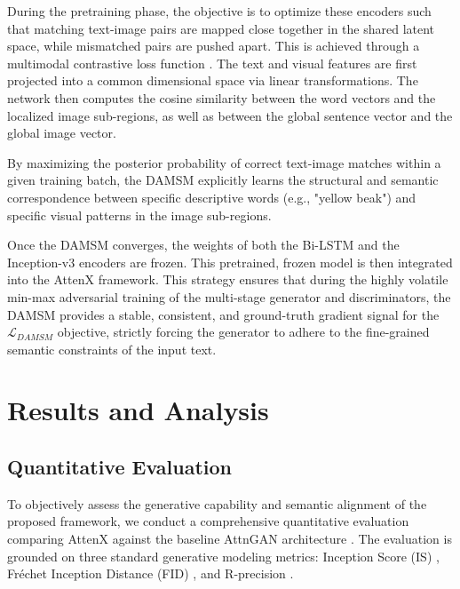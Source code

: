 \documentclass[conference]{IEEEtran}
\begin{document}
During the pretraining phase, the objective is to optimize these encoders such that matching text-image pairs are mapped close together in the shared latent space, while mismatched pairs are pushed apart. This is achieved through a multimodal contrastive loss function \cite{reed2016learning}. The text and visual features are first projected into a common dimensional space via linear transformations. The network then computes the cosine similarity between the word vectors and the localized image sub-regions, as well as between the global sentence vector and the global image vector.

By maximizing the posterior probability of correct text-image matches within a given training batch, the DAMSM explicitly learns the structural and semantic correspondence between specific descriptive words (e.g., "yellow beak") and specific visual patterns in the image sub-regions.

Once the DAMSM converges, the weights of both the Bi-LSTM and the Inception-v3 encoders are frozen. This pretrained, frozen model is then integrated into the AttenX framework. This strategy ensures that during the highly volatile min-max adversarial training of the multi-stage generator and discriminators, the DAMSM provides a stable, consistent, and ground-truth gradient signal for the $\mathcal{L}_{DAMSM}$ objective, strictly forcing the generator to adhere to the fine-grained semantic constraints of the input text.

\section{Results and Analysis}

\subsection{Quantitative Evaluation}

To objectively assess the generative capability and semantic alignment of the proposed framework, we conduct a comprehensive quantitative evaluation comparing AttenX against the baseline AttnGAN architecture \cite{xu2018attngan}. The evaluation is grounded on three standard generative modeling metrics: Inception Score (IS) \cite{salimans2016improved}, Fr\'{e}chet Inception Distance (FID) \cite{heusel2017gans}, and R-precision \cite{xu2018attngan}.
\end{document}
